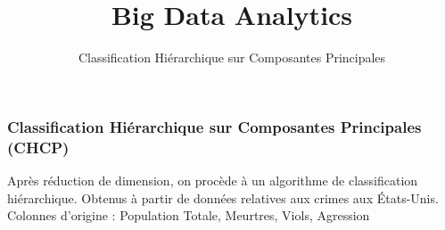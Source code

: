 \documentclass{formation}
\title{Big Data Analytics}
\subtitle{Classification Hiérarchique sur Composantes Principales}
\begin{document}
\maketitle

\begin{frame}
  \frametitle{Classification Hiérarchique sur Composantes Principales (CHCP)}
  Après réduction de dimension, on procède à un algorithme de classification hiérarchique.
  Obtenus à partir de données relatives aux crimes aux États-Unis. \\
  Colonnes d'origine : Population Totale, Meurtres, Viols, Agression
\end{frame}
\end{document}
